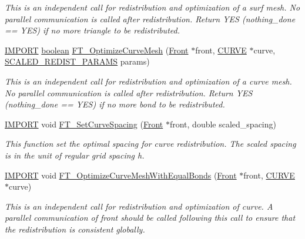 \begin{DoxyCompactItemize}
\begin{DoxyCompactList}\small\item\em This is an independent call for redistribution and optimization of a surf mesh. No parallel communication is called after redistribution. Return Y\+ES (nothing\+\_\+done == Y\+ES) if no more triangle to be redistributed. \end{DoxyCompactList}\item 
\hyperlink{cdecs_8h_a773175d74e73776d69c3e538f17de1ee}{I\+M\+P\+O\+RT} \hyperlink{cdecs_8h_ad048433382a936258fb49e2ec4f148e1}{boolean} \hyperlink{group___o_p_t_i_m_i_z_a_t_i_o_n_ga826694560bce061d09012c44002c3031}{F\+T\+\_\+\+Optimize\+Curve\+Mesh} (\hyperlink{fdecs_8h_ac32202b798f848095c489cfd04c4ca5f}{Front} $\ast$front, \hyperlink{int_8h_a4c1c272bef898dbaa20b055af85cd685}{C\+U\+R\+VE} $\ast$curve, \hyperlink{int_8h_a02cf0c2d24dc56fb5019b39d817aa801}{S\+C\+A\+L\+E\+D\+\_\+\+R\+E\+D\+I\+S\+T\+\_\+\+P\+A\+R\+A\+MS} params)
\begin{DoxyCompactList}\small\item\em This is an independent call for redistribution and optimization of a curve mesh. No parallel communication is called after redistribution. Return Y\+ES (nothing\+\_\+done == Y\+ES) if no more bond to be redistributed. \end{DoxyCompactList}\item 
\hyperlink{cdecs_8h_a773175d74e73776d69c3e538f17de1ee}{I\+M\+P\+O\+RT} void \hyperlink{group___o_p_t_i_m_i_z_a_t_i_o_n_ga21cd4b5d3a9f3a6d36b028c998804291}{F\+T\+\_\+\+Set\+Curve\+Spacing} (\hyperlink{fdecs_8h_ac32202b798f848095c489cfd04c4ca5f}{Front} $\ast$front, double scaled\+\_\+spacing)
\begin{DoxyCompactList}\small\item\em This function set the optimal spacing for curve redistribution. The scaled spacing is in the unit of regular grid spacing h. \end{DoxyCompactList}\item 
\hyperlink{cdecs_8h_a773175d74e73776d69c3e538f17de1ee}{I\+M\+P\+O\+RT} void \hyperlink{group___o_p_t_i_m_i_z_a_t_i_o_n_ga3c10b62e5748339743fd4f685ab8be17}{F\+T\+\_\+\+Optimize\+Curve\+Mesh\+With\+Equal\+Bonds} (\hyperlink{fdecs_8h_ac32202b798f848095c489cfd04c4ca5f}{Front} $\ast$front, \hyperlink{int_8h_a4c1c272bef898dbaa20b055af85cd685}{C\+U\+R\+VE} $\ast$curve)
\begin{DoxyCompactList}\small\item\em This is an independent call for redistribution and optimization of curve. A parallel communication of front should be called following this call to ensure that the redistribution is consistent globally. \end{DoxyCompactList}\item 

\end{DoxyCompactItemize}
